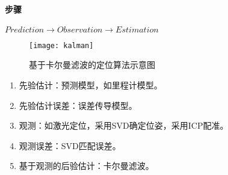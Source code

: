 \documentclass[
12pt, %
a4paper, 
oneside, %
headinclude,footinclude, %
]{scrartcl}
\begin{document}
\paragraph{步骤}
$ Prediction \rightarrow Observation \rightarrow Estimation $

\begin{figure}[H]
\centering 
\texttt{[image: kalman]} 
\caption{基于卡尔曼滤波的定位算法示意图}
\end{figure}

\begin{enumerate}
\item 先验估计：预测模型，如里程计模型。
\item 先验估计误差：误差传导模型。
\item 观测：如激光定位，采用SVD确定位姿，采用ICP配准。
\item 观测误差：SVD匹配误差。
\item 基于观测的后验估计：卡尔曼滤波。
\end{enumerate}
\end{document}
